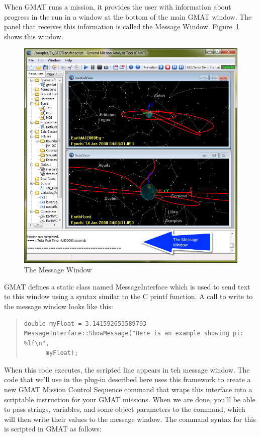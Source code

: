 \documentclass[10pt,letterpaper]{article}
\begin{document}
When GMAT runs a mission, it provides the user with information about progress in the run in a window at the bottom of the main GMAT window.  The panel that receives this information is called the Message Window.  Figure~\ref{msgWindow} shows this window.

\begin{figure}[htb]
\begin{center}
\includegraphics[scale=.5]{images/TheMessageWindow.png}
\caption{\label{msgWindow}The Message Window}
\end{center}
\end{figure}

\noindent GMAT defines a static class named MessageInterface which is used to send text to this window using a syntax similar to the C printf function.  A call to write to the message window looks like this:

\begin{quote}
\begin{verbatim}
double myFloat = 3.141592653589793
MessageInterface::ShowMessage("Here is an example showing pi: %lf\n",
      myFloat);
\end{verbatim}
\end{quote}

\noindent When this code executes, the scripted line appears in teh message window.  The code that we'll use in the plug-in described here uses this framework to create a new GMAT Mission Control Sequence command that wraps this interface into a scriptable instruction for your GMAT missions.  When we are done, you'll be able to pass strings, variables, and some object parameters to the command, which will then write their values to the message window.  The command syntax for this is scripted in GMAT as follows:
\end{document}
